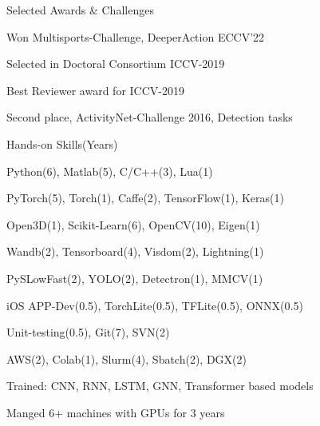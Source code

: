 \documentclass{resume} %
\begin{document}
\begin{multicols}{2}
\begin{mSection}{Selected Awards \& Challenges}{}
\begin{sSubsection}{Won Multisports-Challenge, DeeperAction ECCV'22}\end{sSubsection} %
\begin{sSubsection}{Selected in Doctoral Consortium ICCV-2019}\end{sSubsection}  %
\begin{sSubsection}{Best Reviewer award for ICCV-2019}\end{sSubsection} %
\begin{sSubsection}{Second place, ActivityNet-Challenge 2016, Detection tasks}\end{sSubsection} %
\end{mSection}

\begin{mSection}{Hands-on Skills}{(Years)} 
  \begin{sSubsection}{Python(6), Matlab(5), C/C++(3), Lua(1)}\end{sSubsection}
  \begin{sSubsection}{PyTorch(5), Torch(1), Caffe(2), TensorFlow(1), Keras(1)}\end{sSubsection}
  \begin{sSubsection}{Open3D(1), Scikit-Learn(6), OpenCV(10), Eigen(1)}\end{sSubsection}
  \begin{sSubsection}{Wandb(2), Tensorboard(4), Visdom(2), Lightning(1)}\end{sSubsection}
  \begin{sSubsection}{PySLowFast(2), YOLO(2), Detectron(1), MMCV(1)}\end{sSubsection}
  \begin{sSubsection}{iOS APP-Dev(0.5), TorchLite(0.5), TFLite(0.5), ONNX(0.5)}\end{sSubsection}
  \begin{sSubsection}{Unit-testing(0.5), Git(7), SVN(2)}\end{sSubsection} %
  \begin{sSubsection}{AWS(2), Colab(1), Slurm(4), Sbatch(2), DGX(2)}\end{sSubsection}
  \begin{sSubsection}{Trained: CNN, RNN, LSTM, GNN, Transformer based models}\end{sSubsection}
  \begin{sSubsection}{Manged 6+ machines with GPUs for 3 years }\end{sSubsection}
\end{mSection}


\end{multicols}
\end{document}

